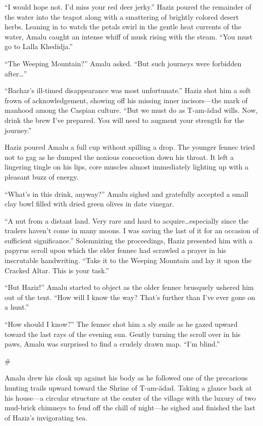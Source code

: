 ``I would hope not. I'd miss your red deer jerky.'' Haziz poured the remainder of the water into the teapot along with a smattering of brightly colored desert herbs. Leaning in to watch the petals swirl in the gentle heat currents of the water, Amalu caught an intense whiff of musk rising with the steam. ``You must go to Lalla Khedidja.''

``The Weeping Mountain?'' Amalu asked. ``But such journeys were forbidden after\ldots''

``Bachar's ill-timed disappearance was most unfortunate.'' Haziz shot him a soft frown of acknowledgement, showing off his missing inner incisors---the mark of manhood among the Caspian culture. ``But we must do as T-am-ădad wills. Now, drink the brew I've prepared. You will need to augment your strength for the journey.''

Haziz poured Amalu a full cup without spilling a drop. The younger fennec tried not to gag as he dumped the noxious concoction down his throat. It left a lingering tingle on his lips, core muscles almost immediately lighting up with a pleasant buzz of energy.

``What's in this drink, anyway?'' Amalu sighed and gratefully accepted a small clay bowl filled with dried green olives in date vinegar.

``A nut from a distant land. Very rare and hard to acquire\ldots especially since the traders haven't come in many moons. I was saving the last of it for an occasion of sufficient significance.'' Solemnizing the proceedings, Haziz presented him with a papyrus scroll upon which the elder fennec had scrawled a prayer in his inscrutable handwriting. ``Take it to the Weeping Mountain and lay it upon the Cracked Altar. This is your task.''

``But Haziz!'' Amalu started to object as the older fennec brusquely ushered him out of the tent. ``How will I know the way? That's further than I've ever gone on a hunt.''

``How should I know?'' The fennec shot him a sly smile as he gazed upward toward the last rays of the evening sun. Gently turning the scroll over in his paws, Amalu was surprised to find a crudely drawn map. ``I'm blind.''

\#

Amalu drew his cloak up against his body as he followed one of the precarious hunting trails upward toward the Shrine of T-am-ădad. Taking a glance back at his house---a circular structure at the center of the village with the luxury of two mud-brick chimneys to fend off the chill of night---he sighed and finished the last of Haziz's invigorating tea.


